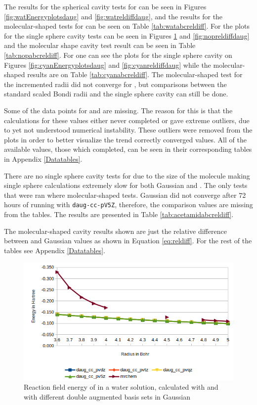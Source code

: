 \documentclass[../master_thesis.tex]{subfiles}
\begin{document}
The results for the spherical cavity tests for  can be seen in Figures
\ref{fig:watEnergyplotsdaug} and \ref{fig:watreldiffdaug}, and the results for the
molecular-shaped tests for  can be seen on Table \ref{tab:watabcreldiff}.
For  the plots for the single sphere cavity tests can be seen in Figures
\ref{fig:nopEnergyplotsdaug} and \ref{fig:nopreldiffdaug} and the molecular
shape cavity test result can be seen in Table \ref{tab:nopabcreldiff}.
For  one can see the plots for the single sphere cavity on Figures
\ref{fig:cyanEnergyplotsdaug} and \ref{fig:cyanreldiffdaug} while the
molecular-shaped results are on Table \ref{tab:cyanabcreldiff}. The molecular-shaped
test for the incremented radii did not converge for , but comparisons between
the standard scaled Bondi radii and the single sphere cavity can still be done.

Some of the data points for  and  are missing. The reason for this
is that the calculations for these values either never completed or gave extreme
outliers, due to yet not understood numerical instability. These outliers were removed from the plots
in order to better visualize the trend correctly converged values.
All of the available values, those which completed, can be seen in their corresponding
tables in Appendix \ref{Datatables}.

There are no single sphere cavity tests for  due to the size of the molecule
making single sphere calculations extremely slow for both Gaussian and \mrchem.
The only tests that were ran where molecular-shaped tests. Gaussian did not converge
after 72 hours of running with \verb!daug-cc-pV5Z!, therefore, the comparison values
are missing from the tables. The  results are presented in Table
\ref{tab:acetamidabcreldiff}.

The molecular-shaped cavity results shown are just the relative difference between
\mrchem and Gaussian values as shown in Equation \ref{eq:reldiff}. For the rest of the
tables see Appendix \ref{Datatables}.

\begin{figure}[!htb]
  \centering
    \includegraphics[width=\linewidth]{img/Erdaugnop.png}
  \caption[Energy plots for ]{Reaction field energy of  in a water solution, calculated with \mrchem
  and with different double augmented basis sets in Gaussian}
  \label{fig:nopEnergyplotsdaug}
\end{figure}
\end{document}

